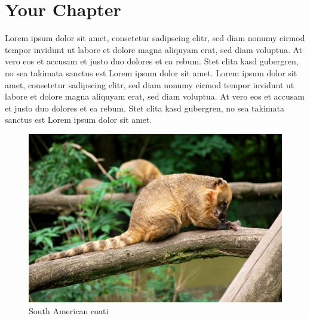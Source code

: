 \documentclass[a4paper]{scrreprt}
\begin{document}
\chapter{Your Chapter}
Lorem ipsum dolor sit amet, consetetur sadipscing elitr, sed diam
nonumy eirmod tempor invidunt ut labore et dolore magna aliquyam
erat, sed diam voluptua. At vero eos et accusam et justo duo dolores
et ea
rebum. Stet clita kasd gubergren, no sea takimata sanctus est Lorem
ipsum dolor sit amet. Lorem ipsum dolor sit amet, consetetur
sadipscing elitr, sed diam nonumy eirmod tempor invidunt ut labore et
dolore magna aliquyam erat, sed diam voluptua. At vero eos et accusam
et justo duo dolores et ea rebum. Stet clita kasd gubergren, no sea
takimata sanctus est Lorem ipsum dolor sit amet.

\begin{figure}[ht]
    \begin{minipage}[b]{0.45\linewidth}
        \centering
        \includegraphics[width=\textwidth]{YourImage.jpg}
        \caption{South American coati}
        \label{fig:nasua}
    \end{minipage}
    \hspace{0.5cm}
    \begin{minipage}[b]{0.45\linewidth}
        \centering

\end{minipage}
\end{figure}
\end{document}
